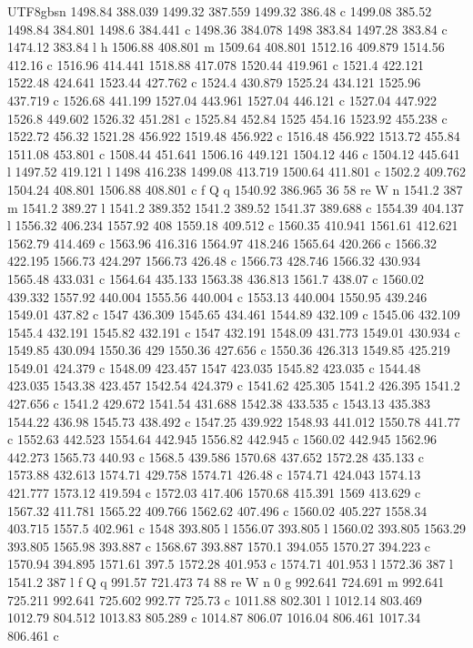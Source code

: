 \documentclass[11pt,a4paper,oneside]{report}
\begin{document}
\begin{CJK*}{UTF8}{gbsn}
{1498.84 388.039 1499.32 387.559 1499.32 386.48 c 1499.08 385.52 1498.84 384.801 1498.6 384.441 c 1498.36
384.078 1498 383.84 1497.28 383.84 c 1474.12 383.84 l h 1506.88 408.801 m 1509.64 408.801 1512.16 409.879
1514.56 412.16 c 1516.96 414.441 1518.88 417.078 1520.44 419.961 c 1521.4 422.121 1522.48 424.641 1523.44
427.762 c 1524.4 430.879 1525.24 434.121 1525.96 437.719 c 1526.68 441.199 1527.04 443.961 1527.04
446.121 c 1527.04 447.922 1526.8 449.602 1526.32 451.281 c 1525.84 452.84 1525 454.16 1523.92 455.238 c
1522.72 456.32 1521.28 456.922 1519.48 456.922 c 1516.48 456.922 1513.72 455.84 1511.08 453.801 c 1508.44
451.641 1506.16 449.121 1504.12 446 c 1504.12 445.641 l 1497.52 419.121 l 1498 416.238 1499.08 413.719
1500.64 411.801 c 1502.2 409.762 1504.24 408.801 1506.88 408.801 c f Q q 1540.92 386.965 36 58 re W n
1541.2 387 m 1541.2 389.27 l 1541.2 389.352 1541.2 389.52 1541.37 389.688 c 1554.39 404.137 l 1556.32
406.234 1557.92 408 1559.18 409.512 c 1560.35 410.941 1561.61 412.621 1562.79 414.469 c 1563.96 416.316
1564.97 418.246 1565.64 420.266 c 1566.32 422.195 1566.73 424.297 1566.73 426.48 c 1566.73 428.746
1566.32 430.934 1565.48 433.031 c 1564.64 435.133 1563.38 436.813 1561.7 438.07 c 1560.02 439.332 1557.92
440.004 1555.56 440.004 c 1553.13 440.004 1550.95 439.246 1549.01 437.82 c 1547 436.309 1545.65 434.461
1544.89 432.109 c 1545.06 432.109 1545.4 432.191 1545.82 432.191 c 1547 432.191 1548.09 431.773 1549.01
430.934 c 1549.85 430.094 1550.36 429 1550.36 427.656 c 1550.36 426.313 1549.85 425.219 1549.01 424.379 c
1548.09 423.457 1547 423.035 1545.82 423.035 c 1544.48 423.035 1543.38 423.457 1542.54 424.379 c 1541.62
425.305 1541.2 426.395 1541.2 427.656 c 1541.2 429.672 1541.54 431.688 1542.38 433.535 c 1543.13 435.383
1544.22 436.98 1545.73 438.492 c 1547.25 439.922 1548.93 441.012 1550.78 441.77 c 1552.63 442.523 1554.64
442.945 1556.82 442.945 c 1560.02 442.945 1562.96 442.273 1565.73 440.93 c 1568.5 439.586 1570.68 437.652
1572.28 435.133 c 1573.88 432.613 1574.71 429.758 1574.71 426.48 c 1574.71 424.043 1574.13 421.777
1573.12 419.594 c 1572.03 417.406 1570.68 415.391 1569 413.629 c 1567.32 411.781 1565.22 409.766 1562.62
407.496 c 1560.02 405.227 1558.34 403.715 1557.5 402.961 c 1548 393.805 l 1556.07 393.805 l 1560.02
393.805 1563.29 393.805 1565.98 393.887 c 1568.67 393.887 1570.1 394.055 1570.27 394.223 c 1570.94
394.895 1571.61 397.5 1572.28 401.953 c 1574.71 401.953 l 1572.36 387 l 1541.2 387 l f Q q 991.57 721.473
74 88 re W n 0 g 992.641 724.691 m 992.641 725.211 992.641 725.602 992.77 725.73 c 1011.88 802.301 l
1012.14 803.469 1012.79 804.512 1013.83 805.289 c 1014.87 806.07 1016.04 806.461 1017.34 806.461 c
}
\end{CJK*}
\end{document}
